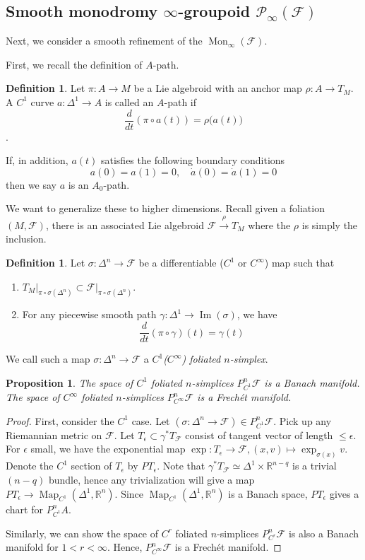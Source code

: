 \documentclass[12pt]{amsart}
\newtheorem{prop}[thm]{Proposition}
\theoremstyle{definition}
\newtheorem{defn}[thm]{Definition}
\theoremstyle{remark}
\numberwithin{equation}{section}
\newcommand{\CF}{{\mathcal F}}
\newcommand{\R}{{\mathbb{R}}}
\newcommand{\1}{{\mathbb{1}}}
\newcommand{\map}{\operatorname{Map}}
\newcommand{\im}{\operatorname{Im}}
\newcommand{\mon}{\operatorname{Mon}}
\begin{document}
\subsection{Smooth monodromy $\infty$-groupoid $\mathcal{P}_{\infty}(\CF)$}

Next, we consider a smooth refinement of the $\mon_{\infty}(\CF)$. 

First, we recall the definition of $A$-path.
\begin{defn}
	Let $\pi: A\to M$ be a Lie algebroid with an anchor map $\rho:A\to T_M$. A $C^1$ curve $a: \Delta^1 \to A$ is called an $A$-path if
	$$ \frac{d}{dt}(\pi\circ a(t)) = \rho\big(a(t) \big)$$.
	
	If, in addition, $a(t)$ satisfies the following boundary conditions
	$$ a(0)=a(1) = 0, \quad \dot{a}(0) = \dot{a}(1) = 0$$
	then we say $a$ is an $A_0$-path.
\end{defn}
We want to generalize these to higher dimensions. Recall given a foliation $(M, \CF)$, there is an associated Lie algebroid $\CF \stackrel{\rho}{\rightarrow} T_M$ where the $\rho$ is simply the inclusion.



\begin{defn}
	Let $\sigma: \Delta^n \to \CF$ be a differentiable ($C^1$ or $C^{\infty}$) map such that
	\begin{enumerate}
		\item $T_M \big|_{ \pi \circ \sigma (\Delta^n)}  \subset \CF\big|_{ \pi \circ \sigma (\Delta^n)}$.
		\item For any piecewise smooth path $\gamma: \Delta^1 \to \im (\sigma)$, we have
		$$
		\frac{d}{dt}(\pi\circ \gamma)(t) = \gamma(t)
		$$
	\end{enumerate}
\end{defn}
We call such a map $\sigma: \Delta^n \to \CF$ a {\it $C^1$($C^{\infty}$) foliated $n$-simplex}. 

\begin{prop}
	The space of $C^1$ foliated $n$-simplices $P^n_{C^1} \mathcal{F}$ is a Banach manifold. The space of $C^{\infty}$ foliated $n$-simplices $P^{n}_{C^{\infty}} \CF$ is a Frech{\'e}t manifold.
\end{prop}

\begin{proof} First, consider the $C^{1}$ case. Let $(\sigma: \Delta^n \to \mathcal{F} )\in P^n_{C^1} \CF$. Pick up any Riemannian metric on $\CF$. Let $T_{\epsilon} \subset \gamma^* T_{\CF}$ consist of tangent vector of length $\le \epsilon$. For $\epsilon$ small, we have the exponential map	
$\exp: T_{\epsilon} \to \CF, (x, v) \mapsto \exp_{\sigma(x)} v$. Denote the $C^1$ section of $T_{\epsilon}$ by $PT_{\epsilon}$. Note that $\gamma^*T_{\CF}\simeq \Delta^1 \times \R^{n-q}$ is a trivial $(n-q)$ bundle, hence any trivialization will give a map $PT_{\epsilon} \to \map_{C^1}(\Delta^1, \R^n)$. Since $\map_{C^1}(\Delta^1, \R^n)$ is a Banach space, $PT_{\epsilon}$ gives a chart for $P^n_{C^1} A$.

Similarly, we can show the space of $C^r$ foliated $n$-simplices $P^n_{C^r} \CF$ is also a Banach manifold for $1<r<\infty$. Hence, $P^{n}_{C^{\infty}}\CF$ is a  Frech{\'e}t manifold.
	\end{proof}
\end{document}
